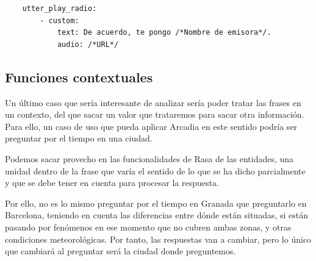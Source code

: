 \begin{lstlisting}
	utter_play_radio:
		- custom:
			text: De acuerdo, te pongo /*Nombre de emisora*/.
			audio: /*URL*/
\end{lstlisting}

\subsection{Funciones contextuales}

Un último caso que sería interesante de analizar sería poder tratar las frases en un contexto, del que sacar un valor que trataremos para sacar otra información. Para ello, un caso de uso que pueda aplicar Arcadia en este sentido podría ser preguntar por el tiempo en una ciudad.

Podemos sacar provecho en las funcionalidades de Rasa de las entidades, una unidad dentro de la frase que varía el sentido de lo que se ha dicho parcialmente y que se debe tener en cuenta para procesar la respuesta.

Por ello, no es lo mismo preguntar por el tiempo en Granada que preguntarlo en Barcelona, teniendo en cuenta las diferencias entre dónde están situadas, si están pasando por fenómenos en ese momento que no cubren ambas zonas, y otras condiciones meteorológicas. Por tanto, las respuestas van a cambiar, pero lo único que cambiará al preguntar será la ciudad donde preguntemos.

